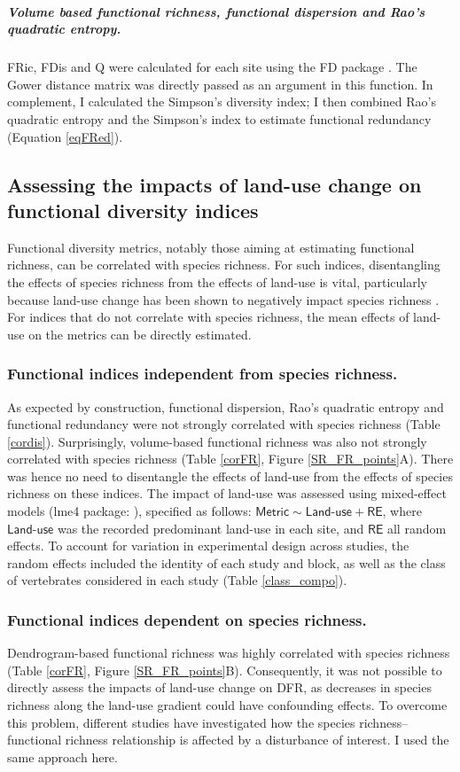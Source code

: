 \subparagraph{Volume based functional richness, functional dispersion and Rao's quadratic entropy.} FRic, FDis and Q were calculated for each site using the FD package \citep{Laliberte2015}. The Gower distance matrix was directly passed as an argument in this function. In complement, I calculated the Simpson's diversity index; I then combined Rao's quadratic entropy and the Simpson's index to estimate functional redundancy (Equation \ref{eqFRed}). 

\subsection{Assessing the impacts of land-use change on functional diversity indices}

Functional diversity metrics, notably those aiming at estimating functional richness, can be correlated with species richness. For such indices, disentangling the effects of species richness from the effects of land-use is vital, particularly because land-use change has been shown to negatively impact species richness \citep{Newbold2015}. For indices that do not correlate with species richness, the mean effects of land-use on the metrics can be directly estimated.

	\subsubsection{Functional indices independent from species richness.}
As expected by construction, functional dispersion, Rao's quadratic entropy and functional redundancy were not strongly correlated with species richness (Table \ref{cordis}). Surprisingly, volume-based functional richness was also not strongly correlated with species richness (Table \ref{corFR}, Figure \ref{SR_FR_points}A). There was hence no need to disentangle the effects of land-use from the effects of species richness on these indices. The impact of land-use was assessed using mixed-effect models (lme4 package: \citet{lme4}), specified as follows: $\textsf{Metric} \sim \textsf{Land-use} + \textsf{RE}$, where $\textsf{Land-use}$ was the recorded predominant land-use in each site, and $\textsf{RE}$ all random effects. To account for variation in experimental design across studies, the random effects included the identity of each study and block, as well as the class of vertebrates considered in each study (Table \ref{class_compo}).

	\subsubsection{Functional indices dependent on species richness.}
Dendrogram-based functional richness was highly correlated with species richness (Table \ref{corFR}, Figure \ref{SR_FR_points}B). Consequently, it was not possible to directly assess the impacts of land-use change on DFR, as decreases in species richness along the land-use gradient could have confounding effects. To overcome this problem, different studies have investigated how the species richness--functional richness relationship is affected by a disturbance of interest. I used the same approach here.

